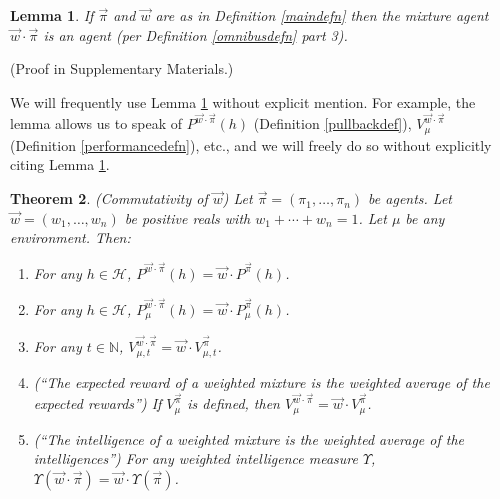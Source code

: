\documentclass[twoside]{article}
\newtheorem{theorem}{Theorem}
\newtheorem{lemma}[theorem]{Lemma}
\begin{document}
\begin{lemma}
\label{mixturereallyisanagent}
    If $\vec\pi$ and $\vec w$ are as in Definition \ref{maindefn}
    then the mixture agent $\vec w\cdot\vec\pi$ is an agent
    (per Definition \ref{omnibusdefn} part 3).
\end{lemma}
\vspace{-0.5em}(Proof in Supplementary Materials.)


We will frequently use Lemma \ref{mixturereallyisanagent} without explicit mention.
For example, the lemma allows us to speak of $P^{\vec w\cdot \vec\pi}(h)$
(Definition \ref{pullbackdef}), $V^{\vec w\cdot\vec\pi}_{\mu}$
(Definition \ref{performancedefn}), etc., and we will freely do so without
explicitly citing Lemma \ref{mixturereallyisanagent}.

\begin{theorem}
\label{maintheorem}
    (Commutativity of $\vec w$)
    Let $\vec\pi=(\pi_1,\ldots,\pi_n)$ be agents.
    Let $\vec w=(w_1,\ldots,w_n)$ be positive reals with
    $w_1+\cdots+w_n=1$. Let $\mu$ be any environment.
    Then:
    \begin{enumerate}
        \item
        For any $h\in\mathcal H$,
        $P^{\vec w\cdot \vec\pi}(h)=\vec w\cdot {P^{\vec\pi}}(h)$.
        \item
        For any $h\in\mathcal H$,
        $P^{\vec w\cdot \vec\pi}_\mu(h)=\vec w \cdot P^{\vec\pi}_\mu(h)$.
        \item
        For any $t\in\mathbb N$,
        $V^{\vec w\cdot \vec\pi}_{\mu,t}=\vec w\cdot V^{\vec\pi}_{\mu,t}$.
        \item
        (``The expected reward of a weighted mixture is the weighted
        average of the expected rewards'')
        If $V^{\vec\pi}_\mu$ is defined, then
        $V^{\vec w\cdot\vec\pi}_\mu=\vec w\cdot V^{\vec\pi}_\mu$.
        \item
        (``The intelligence of a weighted mixture is the weighted average
        of the intelligences'')
        For any weighted intelligence measure $\Upsilon$,
        $\Upsilon(\vec w\cdot\vec\pi)=\vec w\cdot\Upsilon(\vec\pi)$.
    \end{enumerate}
\end{theorem}
\end{document}
